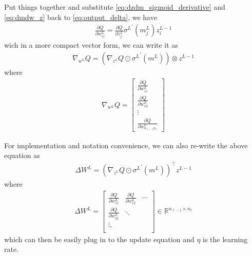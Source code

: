 \documentclass{article} [10pt] %
\begin{document}
Put things together and substitute \eqref{eq:dzdm_sigmoid_derivative}  and \eqref{eq:dmdw_z} back to \eqref{eq:output_delta}, we have
\begin{align}
	\frac{\partial Q}{\partial w^L_{ij}} = \frac{\partial Q}{\partial z^L_{j}}
							{\sigma^L}^\prime(m^L_{j}) 
							z^{L-1}_i
\end{align}
wich in a more compact vector form, we can write it as 
\begin{align}
	\nabla_{w^L} Q = (\nabla_{z^L}Q \odot {\sigma^L}^\prime(m^L)) \otimes z^{L-1}
\end{align}
where
\begin{align}
	\nabla_{w^L} Q = \begin{bmatrix}
		\frac{\partial Q}{\partial w^L_{11}} \\
		\frac{\partial Q}{\partial w^L_{12}} \\
		\vdots\\
		\frac{\partial Q}{\partial w^L_{n_{\ell-1}n_\ell}}
	\end{bmatrix}
\end{align}

For implementation and notation convenience, we can also re-write the above equation as
\begin{align} \label{eq:delta_w_out}
\boxed{
	\Delta W^L = (\nabla_{z^L}Q \odot {\sigma^L}^\prime(m^L))^\top z^{L-1}
}
\end{align}
where
\begin{align}
	\Delta W^L  = \begin{bmatrix}
				\frac{\partial Q}{\partial w^L_{11}} &\frac{\partial Q}{\partial w^L_{12}} &\cdots \\
				\frac{\partial Q}{\partial w^L_{21}} &\ddots \\
				\vdots,\\
				\end{bmatrix} \in \mathbb{R}^{n_{\ell-1}\times n_\ell}
\end{align}
which can then be easily plug in to the update equation  and $\eta$ is the learning rate.
\end{document}
